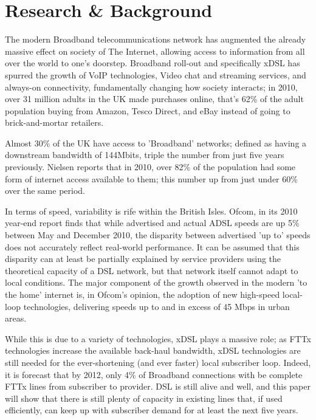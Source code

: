 \chapter{Research \& Background}
\label{fig:sec:research}
The modern Broadband telecommunications network has augmented the already massive effect on society of The Internet, allowing access to information from all over the world to one's doorstep. Broadband roll-out and specifically xDSL has spurred the growth of VoIP technologies, Video chat and streaming services, and always-on connectivity, fundamentally changing how society interacts; in 2010, over 31 million adults in the UK made purchases online, that's 62\% of the adult population buying from Amazon, Tesco Direct, and eBay instead of going to brick-and-mortar retailers.\cite{OfNS10} 

Almost 30\% of the UK have access to 'Broadband' networks; defined as having a downstream bandwidth of 144Mbits,  triple the number from just five years previously. Nielsen reports that in 2010, over 82\% of the population had some form of internet access available to them; this number up from just under 60\% over the same period.

In terms of speed, variability is rife within the British Isles. Ofcom, in its 2010 year-end report \cite{OfC} finds that while advertised and actual ADSL speeds are up 5\% between May and December 2010, the disparity between advertised 'up to' speeds does not accurately reflect real-world performance. It can be assumed that this disparity can at least be partially explained by service providers using the theoretical capacity of a DSL network, but that network itself cannot adapt to local conditions. The major component of the growth observed in the modern 'to the home' internet is, in Ofcom's opinion, the adoption of new high-speed local-loop technologies, delivering speeds up to and in excess of 45 Mbps in urban areas.

While this is due to a variety of technologies, xDSL plays a massive role; as FTTx technologies increase the available back-haul bandwidth, xDSL technologies are still needed for the ever-shortening (and ever faster) local subscriber loop. Indeed, it is forecast that by 2012, only 4\% of Broadband connections with be complete FTTx lines from subscriber to provider. DSL is still alive and well, and this paper will show that there is still plenty of capacity in existing lines that, if used efficiently, can keep up with subscriber demand for at least the next five years.


